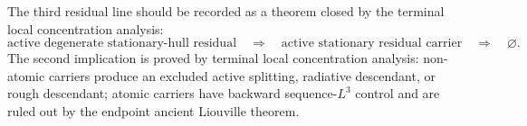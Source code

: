 \begin{remark}
\label{rem:R3S-decomposition}
The third residual line should be recorded as a theorem closed by the terminal
local concentration analysis:
\[
   \text{active degenerate stationary-hull residual}
   \quad\Longrightarrow\quad
   \text{active stationary residual carrier}
   \quad\Longrightarrow\quad
   \varnothing .
\]
The second implication is proved by terminal local concentration analysis:
non-atomic carriers produce an excluded active splitting, radiative descendant,
or rough descendant; atomic carriers have backward sequence-\(L^3\) control and
are ruled out by the endpoint ancient Liouville theorem.
\end{remark}
